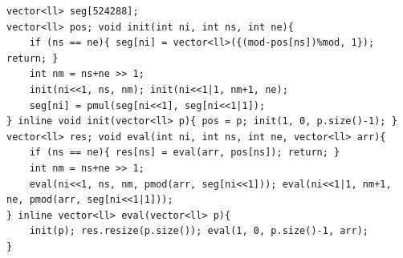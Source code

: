 \begin{verbatim}
vector<ll> seg[524288];
vector<ll> pos; void init(int ni, int ns, int ne){
	if (ns == ne){ seg[ni] = vector<ll>({(mod-pos[ns])%mod, 1}); return; }
	int nm = ns+ne >> 1;
	init(ni<<1, ns, nm); init(ni<<1|1, nm+1, ne);
	seg[ni] = pmul(seg[ni<<1], seg[ni<<1|1]);
} inline void init(vector<ll> p){ pos = p; init(1, 0, p.size()-1); }
vector<ll> res; void eval(int ni, int ns, int ne, vector<ll> arr){
	if (ns == ne){ res[ns] = eval(arr, pos[ns]); return; }
	int nm = ns+ne >> 1;
	eval(ni<<1, ns, nm, pmod(arr, seg[ni<<1])); eval(ni<<1|1, nm+1, ne, pmod(arr, seg[ni<<1|1]));
} inline vector<ll> eval(vector<ll> p){
	init(p); res.resize(p.size()); eval(1, 0, p.size()-1, arr);
}
\end{verbatim}